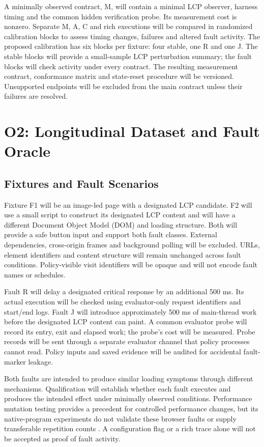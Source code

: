 A minimally observed contract, M, will contain a minimal LCP observer, harness timing and the common hidden verification probe. Its measurement cost is nonzero. Separate M, A, C and rich executions will be compared in randomized calibration blocks to assess timing changes, failures and altered fault activity. The proposed calibration has six blocks per fixture: four stable, one R and one J. The stable blocks will provide a small-sample LCP perturbation summary; the fault blocks will check activity under every contract. The resulting measurement contract, conformance matrix and state-reset procedure will be versioned. Unsupported endpoints will be excluded from the main contract unless their failures are resolved.

\section{O2: Longitudinal Dataset and Fault Oracle}
\label{sec:o2-dataset}

\subsection{Fixtures and Fault Scenarios}

Fixture F1 will be an image-led page with a designated LCP candidate. F2 will use a small script to construct its designated LCP content and will have a different Document Object Model (DOM) and loading structure. Both will provide a safe button input and support both fault classes. External dependencies, cross-origin frames and background polling will be excluded. URLs, element identifiers and content structure will remain unchanged across fault conditions. Policy-visible visit identifiers will be opaque and will not encode fault names or schedules.

Fault R will delay a designated critical response by an additional 500 ms. Its actual execution will be checked using evaluator-only request identifiers and start/end logs. Fault J will introduce approximately 500 ms of main-thread work before the designated LCP content can paint. A common evaluator probe will record its entry, exit and elapsed work; the probe's cost will be measured. Probe records will be sent through a separate evaluator channel that policy processes cannot read. Policy inputs and saved evidence will be audited for accidental fault-marker leakage.

Both faults are intended to produce similar loading symptoms through different mechanisms. Qualification will establish whether each fault executes and produces the intended effect under minimally observed conditions. Performance mutation testing provides a precedent for controlled performance changes, but its native-program experiments do not validate these browser faults or supply transferable repetition counts \parencite{WF5NM72E}. A configuration flag or a rich trace alone will not be accepted as proof of fault activity.


